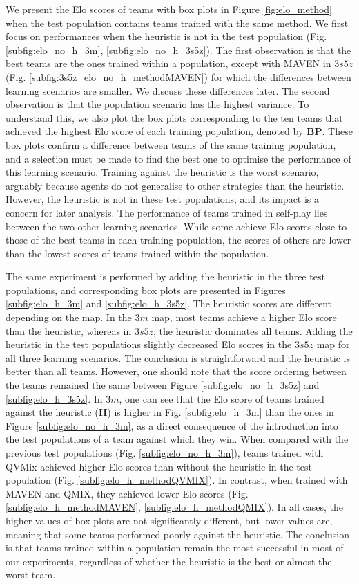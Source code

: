 We present the Elo scores of teams with box plots in Figure \ref{fig:elo_method} when the test population contains teams trained with the same method.
We first focus on performances when the heuristic is not in the test population (Fig. \ref{subfig:elo_no_h_3m}, \ref{subfig:elo_no_h_3s5z}).
The first observation is that the best teams are the ones trained within a population, except with MAVEN in $3s5z$ (Fig. \ref{subfig:3s5z_elo_no_h_methodMAVEN}) for which the differences between learning scenarios are smaller.
We discuss these differences later.
The second observation is that the population scenario has the highest variance.
To understand this, we also plot the box plots corresponding to the ten teams that achieved the highest Elo score of each training population, denoted by \textbf{BP}.
These box plots confirm a difference between teams of the same training population, and a selection must be made to find the best one to optimise the performance of this learning scenario.
Training against the heuristic is the worst scenario, arguably because agents do not generalise to other strategies than the heuristic.
However, the heuristic is not in these test populations, and its impact is a concern for later analysis.
The performance of teams trained in self-play lies between the two other learning scenarios.
While some achieve Elo scores close to those of the best teams in each training population, the scores of others are lower than the lowest scores of teams trained within the population.

The same experiment is performed by adding the heuristic in the three test populations, and corresponding box plots are presented in Figures \ref{subfig:elo_h_3m} and \ref{subfig:elo_h_3s5z}.
The heuristic scores are different depending on the map.
In the $3m$ map, most teams achieve a higher Elo score than the heuristic, whereas in $3s5z$, the heuristic dominates all teams.
Adding the heuristic in the test populations slightly decreased Elo scores in the $3s5z$ map for all three learning scenarios.
The conclusion is straightforward and the heuristic is better than all teams.
However, one should note that the score ordering between the teams remained the same between Figure \ref{subfig:elo_no_h_3s5z} and \ref{subfig:elo_h_3s5z}.
In $3m$, one can see that the Elo score of teams trained against the heuristic (\textbf{H}) is higher in Fig. \ref{subfig:elo_h_3m} than the ones in Figure \ref{subfig:elo_no_h_3m}, as a direct consequence of the introduction into the test populations of a team against which they win.
When compared with the previous test populations (Fig. \ref{subfig:elo_no_h_3m}), teams trained with QVMix achieved higher Elo scores than without the heuristic in the test population (Fig. \ref{subfig:elo_h_methodQVMIX}).
In contrast, when trained with MAVEN and QMIX, they achieved lower Elo scores (Fig. \ref{subfig:elo_h_methodMAVEN}, \ref{subfig:elo_h_methodQMIX}).
In all cases, the higher values of box plots are not significantly different, but lower values are, meaning that some teams performed poorly against the heuristic.
The conclusion is that teams trained within a population remain the most successful in most of our experiments, regardless of whether the heuristic is the best or almost the worst team.

